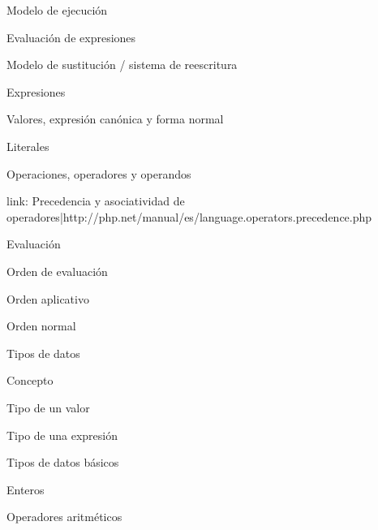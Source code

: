 \begin{longenum}
\begin{longenum}
        \item Modelo de ejecución
        \begin{longenum}
            \item Evaluación de expresiones
            \item Modelo de sustitución / sistema de reescritura
        \end{longenum}
        \item Expresiones
        \begin{longenum}
            \item Valores, expresión canónica y forma normal
            \item Literales
            \item Operaciones, operadores y operandos
            \begin{longenum}
                \item [link: Precedencia y asociatividad de operadores|http://php.net/manual/es/language.operators.precedence.php]
            \end{longenum}
            \item Evaluación
            \begin{longenum}
                \item Orden de evaluación
                \begin{longenum}
                    \item Orden aplicativo
                    \item Orden normal
                \end{longenum}
            \end{longenum}
            \item Tipos de datos
            \begin{longenum}
                \item Concepto
                \begin{longenum}
                    \item Tipo de un valor
                    \item Tipo de una expresión
                \end{longenum}
                \item Tipos de datos básicos
                \begin{longenum}
                    \item Enteros
                    \begin{longenum}
                        \item Operadores aritméticos

\end{longenum}
\end{longenum}
\end{longenum}
\end{longenum}
\end{longenum}
\end{longenum}

